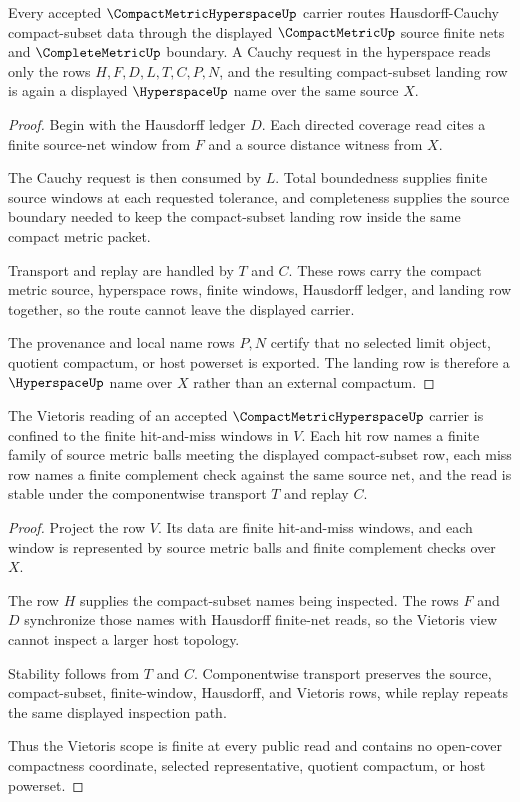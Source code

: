 \begin{theorem}
\label{thm:compact-metric-hyperspace-hausdorff-completion-route}
Every accepted $\CompactMetricHyperspaceUp$ carrier routes Hausdorff-Cauchy compact-subset data through the displayed $\CompactMetricUp$ source finite nets and $\CompleteMetricUp$ boundary. A Cauchy request in the hyperspace reads only the rows $H,F,D,L,T,C,P,N$, and the resulting compact-subset landing row is again a displayed $\HyperspaceUp$ name over the same source $X$.
\end{theorem}
\begin{proof}
Begin with the Hausdorff ledger $D$. Each directed coverage read cites a finite source-net window from $F$ and a source distance witness from $X$.

The Cauchy request is then consumed by $L$. Total boundedness supplies finite source windows at each requested tolerance, and completeness supplies the source boundary needed to keep the compact-subset landing row inside the same compact metric packet.

Transport and replay are handled by $T$ and $C$. These rows carry the compact metric source, hyperspace rows, finite windows, Hausdorff ledger, and landing row together, so the route cannot leave the displayed carrier.

The provenance and local name rows $P,N$ certify that no selected limit object, quotient compactum, or host powerset is exported. The landing row is therefore a $\HyperspaceUp$ name over $X$ rather than an external compactum.
\end{proof}

\begin{theorem}
\label{thm:compact-metric-hyperspace-vietoris-finite-net-scope}
The Vietoris reading of an accepted $\CompactMetricHyperspaceUp$ carrier is confined to the finite hit-and-miss windows in $V$. Each hit row names a finite family of source metric balls meeting the displayed compact-subset row, each miss row names a finite complement check against the same source net, and the read is stable under the componentwise transport $T$ and replay $C$.
\end{theorem}
\begin{proof}
Project the row $V$. Its data are finite hit-and-miss windows, and each window is represented by source metric balls and finite complement checks over $X$.

The row $H$ supplies the compact-subset names being inspected. The rows $F$ and $D$ synchronize those names with Hausdorff finite-net reads, so the Vietoris view cannot inspect a larger host topology.

Stability follows from $T$ and $C$. Componentwise transport preserves the source, compact-subset, finite-window, Hausdorff, and Vietoris rows, while replay repeats the same displayed inspection path.

Thus the Vietoris scope is finite at every public read and contains no open-cover compactness coordinate, selected representative, quotient compactum, or host powerset.
\end{proof}

